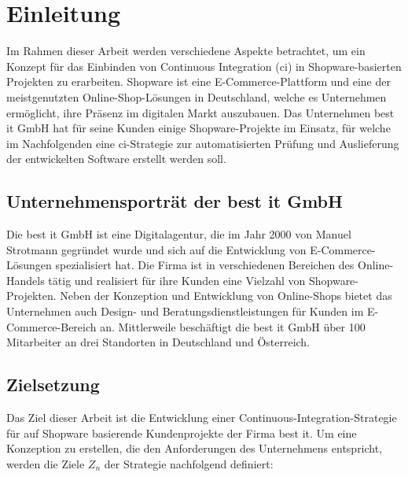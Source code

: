
\section{Einleitung} \label{sec:01-introduction}

Im Rahmen dieser Arbeit werden verschiedene Aspekte betrachtet, um ein Konzept für das Einbinden von
Continuous Integration (\acrshort{ci}) in Shopware-basierten Projekten zu erarbeiten.
Shopware ist eine E-Commerce-Plattform und eine der meistgenutzten Online-Shop-Lösungen in
Deutschland, welche es Unternehmen ermöglicht, ihre Präsenz im digitalen Markt
auszubauen.
Das Unternehmen best it GmbH hat für seine Kunden einige Shopware-Projekte im Einsatz, für welche im Nachfolgenden
eine \acrshort{ci}-Strategie zur automatisierten Prüfung und Auslieferung der entwickelten Software erstellt werden
soll.

\subsection{Unternehmensporträt der best it GmbH} \label{subsec:01-introduction-1}

Die best it GmbH ist eine Digitalagentur, die im Jahr 2000 von Manuel Strotmann gegründet wurde und sich auf die
Entwicklung von E-Commerce-Lösungen spezialisiert hat.
Die Firma ist in verschiedenen Bereichen des Online-Handels tätig und realisiert für ihre Kunden eine Vielzahl von
Shopware-Projekten.
Neben der Konzeption und Entwicklung von Online-Shops bietet das Unternehmen auch Design- und
Beratungsdienstleistungen für Kunden im E-Commerce-Bereich an.
Mittlerweile beschäftigt die best it GmbH über 100 Mitarbeiter an drei Standorten in Deutschland und Österreich.

\subsection{Zielsetzung} \label{subsec:01-introduction-2}

Das Ziel dieser Arbeit ist die Entwicklung einer Continuous-Integration-Strategie für auf Shopware basierende
Kundenprojekte der Firma best it.
Um eine Konzeption zu erstellen, die den Anforderungen des Unternehmens entspricht, werden die Ziele $Z_n$ der Strategie
nachfolgend definiert:

